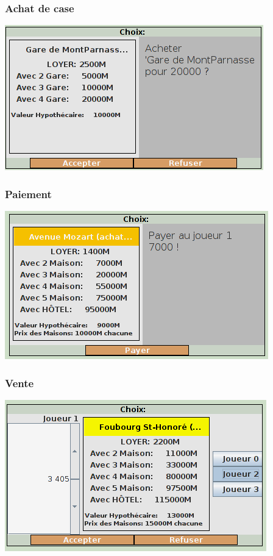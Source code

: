 \documentclass{beamer}
\begin{document}
\begin{darkframes}
    \begin{frame}
 	 \frametitle{Achat de case}
 	 \begin{center}
 	 \includegraphics[scale=0.50]{./img/choixAchat.png}
		
	\end{center}
    \end{frame}
    
    \begin{frame}
 	 \frametitle{Paiement}
 	 \begin{center}
 	 \includegraphics[scale=0.50]{./img/choixPaiement.png}
		
	\end{center}
    \end{frame}
    
    \begin{frame}
 	 \frametitle{Vente}
 	 \begin{center}
 	 \includegraphics[scale=0.50]{./img/choixEchange.png}
		

\end{center}
\end{frame}
\end{darkframes}
\end{document}
